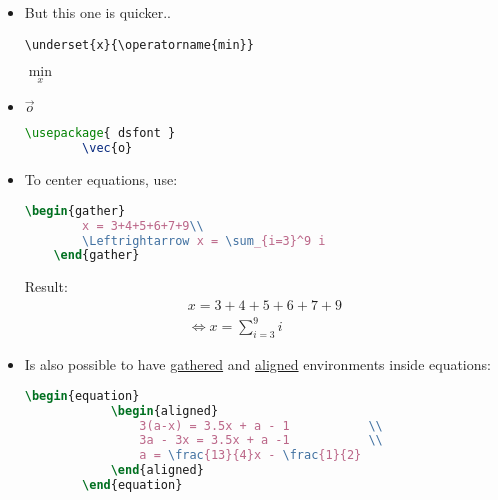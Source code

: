 \begin{itemize}
\begin{lstlisting}[language = Tex, numbers = none]
        \begin{equation}
            \hat{\bb{S}} = \operatorname*{argmin}_\bb{S} \left\Vert\bb{X} - \bb{A}\bb{S}\right\Vert^2_F
        \end{equation}
    \end{lstlisting}
    \begin{equation}
        \hat{\bb{S}} = \operatorname*{argmin}_\bb{S} \left\Vert\bb{X} - \bb{A}\bb{S}\right\Vert^2_F
    \end{equation}
    \item But this one is quicker..
    \begin{lstlisting}[language=Tex, numbers=none]
        \underset{x}{\operatorname{min}} 
    \end{lstlisting}
    $\underset{x}{\operatorname{min}} $

    \item {} $\vec{o}$
    \begin{lstlisting}[language=TeX]
        \usepackage{ dsfont }
        \vec{o}
    \end{lstlisting}

    \item To center equations, use:
    \begin{lstlisting}[language=tex]
    \begin{gather}
        x = 3+4+5+6+7+9\\
        \Leftrightarrow x = \sum_{i=3}^9 i
    \end{gather}    
    \end{lstlisting}
    
    Result:
    \begin{gather}
        x = 3+4+5+6+7+9\\
        \Leftrightarrow x = \sum_{i=3}^9 i
    \end{gather}    

    \item Is also possible to have \ul{gathered} and \ul{aligned} environments inside equations:
    \begin{lstlisting}[language=TeX]
        \begin{equation}
            \begin{aligned}
                3(a-x) = 3.5x + a - 1           \\
                3a - 3x = 3.5x + a -1           \\
                a = \frac{13}{4}x - \frac{1}{2} 
            \end{aligned}
        \end{equation}
    \end{lstlisting}


\end{itemize}
